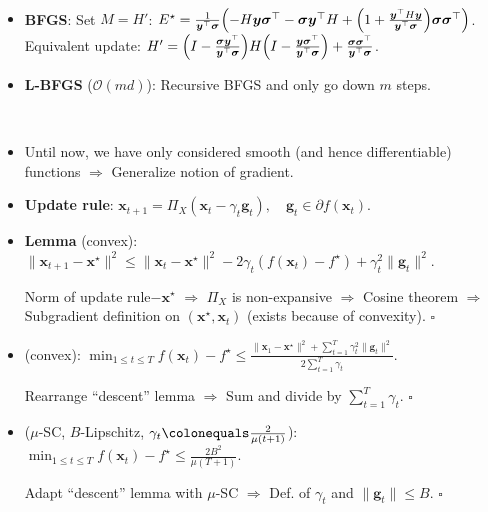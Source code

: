 \documentclass[8pt,a4paper]{extarticle}
\renewcommand{\proof}[1]{\begin{tcolorbox}#1 \hfill $\square$\end{tcolorbox}}
\newcommand{\lft}{\mathopen{}\mathclose\bgroup\left}
\newcommand{\rgt}{\aftergroup\egroup\right}
\renewcommand{\vec}[1]{\bm{#1}}
\newcommand{\mat}[1]{#1}
\newenvironment{topic}[1]
{\textbf{\sffamily \colorbox{black}{\rlap{\textbf{\textcolor{white}{#1}}}\hspace{\linewidth}\hspace{-2\fboxsep}}} \\ \vspace{0.2cm}}
{}
\begin{document}
\begin{multicols*}{2}
\begin{topic}{Quasi-Newton methods}
\begin{itemize}
            \item \textbf{BFGS}: Set $\mat{M} = \mat{H}'$: $\mat{E}^\star = \frac{1}{\vec{y}^\top \vec{\sigma}} \lft( - \mat{H} \vec{y} \vec{\sigma}^\top - \vec{\sigma} \vec{y}^\top \mat{H} + \lft( 1 + \frac{\vec{y}^\top \mat{H} \vec{y}}{\vec{y}^\top \vec{\sigma}} \rgt) \vec{\sigma} \vec{\sigma}^\top \rgt)$.
                  Equivalent update: $\mat{H}' = \lft( \mat{I} - \frac{\vec{\sigma} \vec{y}^\top}{\vec{y}^\top \vec{\sigma}} \rgt) \mat{H} \lft( \mat{I} - \frac{\vec{y} \vec{\sigma}^\top}{\vec{y}^\top \vec{\sigma}} \rgt) + \frac{\vec{\sigma} \vec{\sigma}^\top}{\vec{y}^\top \vec{\sigma}}$.
            \item \textbf{L-BFGS} ($\mathcal{O}(md)$): Recursive BFGS and only go down $m$ steps.
        \end{itemize}
    \end{topic}

    \begin{topic}{Subgradient method}
        \begin{itemize}
            \item Until now, we have only considered smooth (and hence differentiable) functions $\Rightarrow$
                  Generalize notion of gradient.
            \item \textbf{Update rule}: $\vec{x}_{t+1} = \Pi_X(\vec{x}_t - \gamma_t \vec{g}_t), \quad \vec{g}_t \in \partial f(\vec{x}_t)$.
            \item \textbf{Lemma} (convex): $\| \vec{x}_{t+1} - \vec{x}^\star \|^2 \leq \| \vec{x}_t - \vec{x}^\star \|^2 - 2 \gamma_t (f(\vec{x}_t) - f^\star) + \gamma_t^2 \| \vec{g}_t \|^2$.
                  \proof{Norm of update rule$-\vec{x}^\star$ $\Rightarrow$ $\Pi_X$ is non-expansive $\Rightarrow$ Cosine theorem $\Rightarrow$ Subgradient definition on $(\vec{x}^\star, \vec{x}_t)$ (exists because of convexity).}
            \item (convex): $\min_{1 \leq t \leq T} f(\vec{x}_t) - f^\star \leq \frac{\| \vec{x}_1 - \vec{x}^\star \|^2 + \sum_{t=1}^{T} \gamma_t^2 \| \vec{g}_t \|^2}{2 \sum_{t=1}^{T} \gamma_t}$.
                  \proof{Rearrange ``descent'' lemma $\Rightarrow$ Sum and divide by $\sum_{t=1}^T \gamma_t$.}
            \item ($\mu$-SC, $B$-Lipschitz, $\gamma_t \colonequals \frac{2}{\mu(t+1)}$): $\min_{1 \leq t \leq T} f(\vec{x}_t) - f^\star \leq \frac{2B^2}{\mu(T+1)}$.
                  \proof{Adapt ``descent'' lemma with $\mu$-SC $\Rightarrow$ Def. of $\gamma_t$ and $\| \vec{g}_t \| \leq B$.}
        \end{itemize}
    \end{topic}


\end{multicols*}
\end{document}
